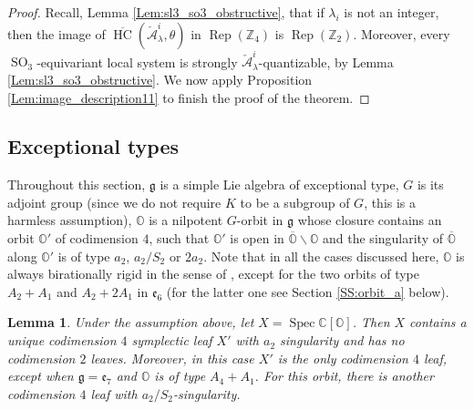 \documentclass[12pt]{amsart}
\newcommand{\C}{\mathbb{C}}
\newcommand{\A}{\mathcal{A}}
\newcommand{\g}{\mathfrak{g}}
\newcommand{\Orb}{\mathbb{O}}
\newcommand{\Z}{\mathbb{Z}}
\newcommand{\HC}{\operatorname{HC}}
\newcommand{\spec}{\operatorname{Spec}}
\newtheorem{Lem}[Thm]{Lemma}
\theoremstyle{definition}
\numberwithin{equation}{section}
\begin{document}
\begin{proof}
Recall, Lemma \ref{Lem:sl3_so3_obstructive}, that if $\lambda_i$ is not an integer, then the image of $\overline{\HC}(\check{\A}^i_\lambda,\theta)$  in $\operatorname{Rep}(\Z_4)$ is $\operatorname{Rep}(\Z_2)$. Moreover, every $\operatorname{SO}_3$-equivariant local system
is strongly $\check{\A}^i_\lambda$-quantizable, by Lemma \ref{Lem:sl3_so3_obstructive}. We now apply Proposition \ref{Lem:image_description11} to finish the proof of the theorem.
\end{proof}

\subsection{Exceptional types}\label{SS_exceptional}

Throughout this section, $\g$ is a simple Lie algebra of exceptional type, $G$ is its adjoint group (since we do not require $K$
to be a subgroup of $G$, this is a harmless assumption), $\Orb$ is a nilpotent $G$-orbit in $\g$ whose closure contains an orbit $\Orb'$ of codimension $4$, such that $\Orb'$ is open in $\overline{\Orb} \backslash \Orb$ and the singularity of $\overline{\Orb}$ along $\Orb'$ is of type $a_2$, $a_2 / S_2$ or $2a_2$. Note that in all the cases discussed here, $\Orb$ is always birationally rigid in the sense of \cite[Definition 1.2]{orbit}, except for the two orbits of type $A_2 + A_1$ and $A_2+2A_1$ in $\mathfrak{e}_6$ (for the latter one see Section \ref{SS:orbit_a} below).

\begin{Lem}\label{lem:only_a2}
	Under the assumption above, let $X = \spec \C[\Orb]$. Then $X$ contains a unique codimension $4$ symplectic leaf $X'$ with $a_2$ singularity and has no codimension $2$ leaves. Moreover, in this case $X'$ is the only  codimension $4$ leaf, except when $\g = \mathfrak{e}_7$ and $\Orb$ is of type $A_4+A_1$. For this orbit, there is another codimension $4$ leaf with $a_2/S_2$-singularity.
\end{Lem}
\end{document}

